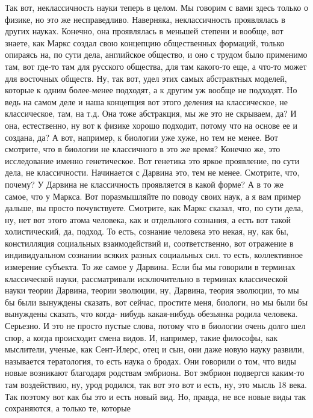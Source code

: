 Так вот, неклассичность науки теперь в целом. Мы
говорим с вами здесь только о физике, но это же несправедливо. Наверняка,
неклассичность проявлялась в других науках. Конечно, она проявлялась в меньшей
степени и вообще, вот знаете, как Маркс создал свою концепцию общественных
формаций, только опираясь на, по сути дела, английское общество, и оно с трудом
было применимо там, вот где-то там для русского общества, для там какого-то еще,
а что-то может для восточных обществ. Ну, так вот, удел этих самых абстрактных
моделей, которые к одним более-менее подходят, а к другим уж вообще не подходят.
Но ведь на самом деле и наша концепция вот этого деления на классическое, не
классическое, там, на т.д. Она тоже абстракция, мы же это не скрываем, да? И
она, естественно, ну вот к физике хорошо подходит, потому что на основе ее и
создана, да? А вот, например, к биологии уже хуже, но тем не менее. Вот
смотрите, что в биологии не классичного в это же время? Конечно же, это
исследование именно генетическое. Вот генетика это яркое проявление, по сути
дела, не классичности. Начинается с Дарвина это, тем не менее. Смотрите, что,
почему? У Дарвина не классичность проявляется в какой форме? А в то же самое,
что у Маркса. Вот поразмышляйте по поводу своих наук, а я вам пример дальше, вы
просто почувствуете. Смотрите, как Маркс сказал, что, по сути дела, ну, нет вот
этого атома человека, как и отдельного сознания, а есть вот такой холистический,
да, подход. То есть, сознание человека это некая, ну, как бы, констилляция
социальных взаимодействий и, соответственно, вот отражение в индивидуальном
сознании всяких разных социальных сил. то есть, коллективное измерение субъекта.
То же самое у Дарвина. Если бы мы говорили в терминах классической науки,
рассматривали исключительно в терминах классической науки теории Дарвина, теории
эволюции, ну, Дарвина, теория эволюции, то мы бы были вынуждены сказать, вот
сейчас, простите меня, биологи, но мы были бы вынуждены сказать, что когда-
нибудь какая-нибудь обезьянка родила человека. Серьезно. И это не просто пустые
слова, потому что в биологии очень долго шел спор, а когда происходит смена
видов. И, например, такие философы, как мыслители, ученые, как Сент-Илерс, отец
и сын, они даже новую науку развили, называется тератология, то есть наука о
бродах. Они говорили о том, что виды новые возникают благодаря родствам
эмбриона. Вот эмбрион подвергся каким-то там воздействию, ну, урод родился, так
вот это вот и есть, ну, это мысль 18 века. Так поэтому вот как бы это и есть
новый вид. Но, правда, не все новые виды так сохраняются, а только те, которые
